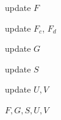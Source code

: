 \begin{section}
\begin{algorithm}[tb]
\begin{algorithmic}

\STATE update $F$

\STATE update $F_c$, $F_d$

\STATE  update $G$

\STATE  update $S$

\STATE  update $U, V$


\ENDFOR

 $F,G,S,U,V$

\end{algorithmic}
\label{algorithm:TRIMF}
\end{algorithm}

\end{section}
